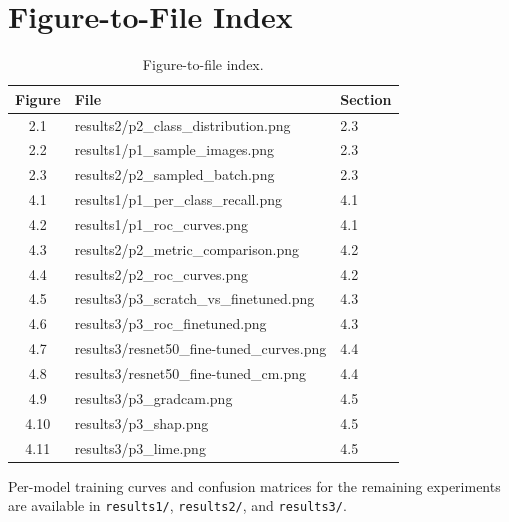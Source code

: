 \documentclass[11pt,a4paper]{article}
\numberwithin{figure}{section}
\numberwithin{table}{section}
\let\oldsection\section
\renewcommand{\section}{\clearpage\oldsection}
\begin{document}
\section{Figure-to-File Index}
\begin{table}[H]
\centering
\caption{Figure-to-file index.}
\label{tab:appB}
\begin{tabular}{cll}
\toprule
Figure & File & Section \\
\midrule
2.1 & results2/p2\_class\_distribution.png & 2.3 \\
2.2 & results1/p1\_sample\_images.png & 2.3 \\
2.3 & results2/p2\_sampled\_batch.png & 2.3 \\
4.1 & results1/p1\_per\_class\_recall.png & 4.1 \\
4.2 & results1/p1\_roc\_curves.png & 4.1 \\
4.3 & results2/p2\_metric\_comparison.png & 4.2 \\
4.4 & results2/p2\_roc\_curves.png & 4.2 \\
4.5 & results3/p3\_scratch\_vs\_finetuned.png & 4.3 \\
4.6 & results3/p3\_roc\_finetuned.png & 4.3 \\
4.7 & results3/resnet50\_fine-tuned\_curves.png & 4.4 \\
4.8 & results3/resnet50\_fine-tuned\_cm.png & 4.4 \\
4.9 & results3/p3\_gradcam.png & 4.5 \\
4.10 & results3/p3\_shap.png & 4.5 \\
4.11 & results3/p3\_lime.png & 4.5 \\
\bottomrule
\end{tabular}
\end{table}
Per-model training curves and confusion matrices for the remaining experiments are available in
\texttt{results1/}, \texttt{results2/}, and \texttt{results3/}.
\end{document}
